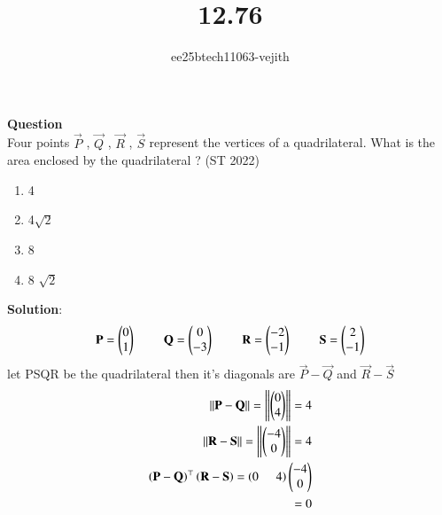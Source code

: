 \documentclass[journal]{IEEEtran}
\begin{document}

\vspace{3cm}

\title{12.76}
\author{ee25btech11063-vejith}

\maketitle
{\let\newpage\relax\maketitle}
\renewcommand{\thefigure}{\theenumi}
\renewcommand{\thetable}{\theenumi}
\setlength{\intextsep}{10pt} %
\textbf{Question}\\
Four points  $\Vec{P}$ , $\Vec{Q}$ , $\Vec{R}$ , $\Vec{S}$  represent the vertices of a quadrilateral. What is  the area enclosed by the quadrilateral ?
\hfill (ST 2022)
\begin{multicols}{4}
\begin{enumerate}
\item 4
\item 4$\sqrt{2}$
\item 8
\item 8 $\sqrt{2}$
\end{enumerate}
\end{multicols}
\textbf{Solution}:\\
\begin{align}
\mathbf{P} = \begin{pmatrix}0 \\ 1\end{pmatrix} \hspace{0.8cm}
\mathbf{Q} = \begin{pmatrix}0 \\ -3\end{pmatrix} \hspace{0.8cm}
\mathbf{R} = \begin{pmatrix}-2 \\ -1\end{pmatrix} \hspace{0.8cm}
\mathbf{S} = \begin{pmatrix}2 \\ -1\end{pmatrix}
\end{align}
let PSQR be the quadrilateral then it's diagonals are $\vec{P}-\vec{Q}$ and $\vec{R}-\vec{S}$\\
\begin{align}
    \left\lVert\mathbf{P}-\mathbf{Q}\right\rVert=\left\lVert\begin{pmatrix}0\\4\end{pmatrix}\right\rVert=4\\
    \left\lVert\mathbf{R}-\mathbf{S}\right\rVert=\left\lVert\begin{pmatrix}-4\\0\end{pmatrix}\right\rVert=4\\
    \left(\mathbf{P}-\mathbf{Q}\right)^{\top}\left(\mathbf{R}-\mathbf{S}\right)=\left(0\hspace{0.5cm} 4\right)\begin{pmatrix}-4\\0\end{pmatrix}\\
    =0
    \end{align}
\end{document}
